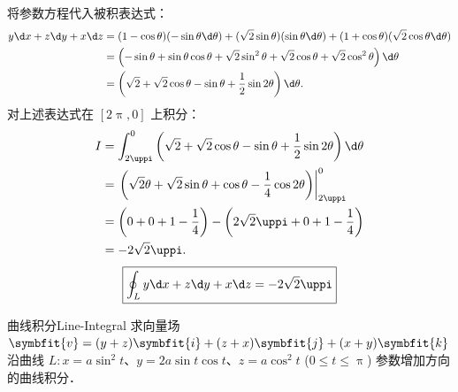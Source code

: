 \begin{solution}
    将参数方程代入被积表达式：
    \begin{equation}
        \begin{aligned}
            y \d x + z \d y + x \d z & = (1 - \cos \theta)(-\sin \theta \d \theta) + (\sqrt{2} \sin \theta)(\sin \theta \d \theta) + (1 + \cos \theta)(\sqrt{2} \cos \theta \d \theta) \\
                                     & = \left( -\sin \theta + \sin \theta \cos \theta + \sqrt{2} \sin^2 \theta + \sqrt{2} \cos \theta + \sqrt{2} \cos^2 \theta \right) \d \theta      \\
                                     & = \left( \sqrt{2} + \sqrt{2} \cos \theta - \sin \theta + \frac{1}{2} \sin 2\theta \right) \d \theta.
        \end{aligned}
    \end{equation}
    对上述表达式在 $[2\uppi, 0]$ 上积分：
    \begin{equation}
        \begin{aligned}
            I & = \int_{2\uppi}^0 \left( \sqrt{2} + \sqrt{2} \cos \theta - \sin \theta + \frac{1}{2} \sin 2\theta \right) \d \theta       \\
              & = \left. \left( \sqrt{2}\theta + \sqrt{2} \sin \theta + \cos \theta - \frac{1}{4} \cos 2\theta \right) \right|_{2\uppi}^0 \\
              & = \left( 0 + 0 + 1 - \frac{1}{4} \right) - \left( 2\sqrt{2}\uppi + 0 + 1 - \frac{1}{4} \right)                            \\
              & = -2\sqrt{2}\uppi.
        \end{aligned}
    \end{equation}
    \begin{equation}
        \boxed{\oint_L y \d x + z \d y + x \d z = -2\sqrt{2}\uppi}
    \end{equation}
\end{solution}

\begin{problem}{曲线积分}{Line-Integral}
    求向量场 $\symbfit{v} = (y + z)\symbfit{i} + (z + x)\symbfit{j} + (x + y)\symbfit{k}$ 沿曲线 $L: x = a \sin^2 t$、$y = 2a \sin t \cos t$、$z = a \cos^2 t$ ($0 \leqslant t \leqslant \uppi$) 参数增加方向的曲线积分．
\end{problem}

